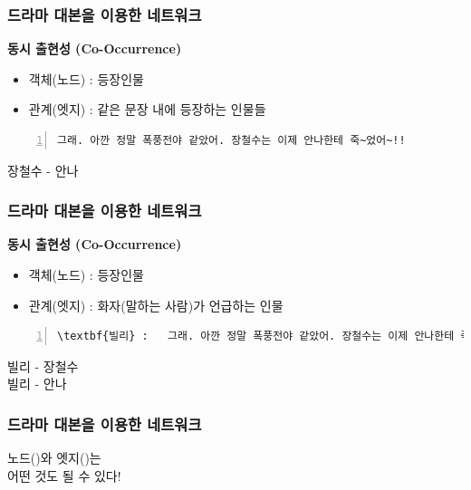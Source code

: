 \documentclass{beamer}
\begin{document}
\begin{frame}[fragile]
\frametitle{드라마 대본을 이용한 네트워크}
\textbf{동시 출현성 (Co-Occurrence)}
\begin{itemize}
\item 객체(노드) : 등장인물\\
\item 관계(엣지) : 같은 문장 내에 등장하는 인물들
\end{itemize}
\begin{block}{}
\scriptsize
	\begin{Verbatim}[numbers=left,commandchars=\\\{\}]
그래. 아깐 정말 폭풍전야 같았어. 장철수는 이제 안나한테 죽~었어~!!
	\end{Verbatim}
\end{block}
\begin{center}
장철수 - 안나
\end{center}
\end{frame}

\begin{frame}[fragile]
\frametitle{드라마 대본을 이용한 네트워크}
\textbf{동시 출현성 (Co-Occurrence)}
\begin{itemize}
\item 객체(노드) : 등장인물\\
\item 관계(엣지) : 화자(말하는 사람)가 언급하는 인물
\end{itemize}
\begin{block}{}
\scriptsize
	\begin{Verbatim}[numbers=left,commandchars=\\\{\}]
\textbf{빌리}	:	그래. 아깐 정말 폭풍전야 같았어. 장철수는 이제 안나한테 죽~었어~!!
	\end{Verbatim}
\end{block}
\begin{center}
빌리 - 장철수\\
빌리 - 안나
\end{center}
\end{frame}

\begin{frame}[fragile]
\frametitle{드라마 대본을 이용한 네트워크}
\huge
\begin{center}
노드({\color{blue}{Node}})와 엣지({\color{red}{Edge}})는\\
어떤 것도 될 수 있다!
\end{center}
\end{frame}
\end{document}
